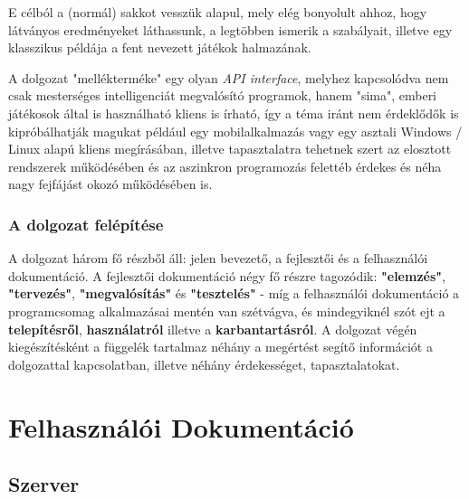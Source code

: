 \documentclass[twoside, a4paper, 12pt]{book}
\begin{document}
E célból a (normál) sakkot vesszük alapul, mely elég bonyolult ahhoz, hogy látványos eredményeket láthassunk, a legtöbben ismerik a szabályait, illetve egy klasszikus példája a fent nevezett játékok halmazának.

A dolgozat "mellékterméke" egy olyan \textit{API interface}, melyhez kapcsolódva nem csak mesterséges intelligenciát megvalósító programok, hanem "sima", emberi játékosok által is használható kliens is írható, így a téma iránt nem érdeklődők is kipróbálhatják magukat például egy mobilalkalmazás vagy egy asztali Windows / Linux alapú kliens megírásában, illetve tapasztalatra tehetnek szert az elosztott rendszerek működésében és az aszinkron programozás felettéb érdekes és néha nagy fejfájást okozó működésében is.

\section{A dolgozat felépítése}
A dolgozat három fő részből áll: jelen bevezető, a fejlesztői és a felhasználói dokumentáció.
A fejlesztői dokumentáció négy fő részre tagozódik: \textbf{"elemzés"}, \textbf{"tervezés"}, \textbf{"megvalósítás"} és \textbf{"tesztelés"} - míg a felhasználói dokumentáció a programcsomag alkalmazásai mentén van szétvágva, és mindegyiknél szót ejt a \textbf{telepítésről}, \textbf{használatról} illetve a \textbf{karbantartásról}.
A dolgozat végén kiegészítésként a függelék tartalmaz néhány a megértést segítő információt a dolgozattal kapcsolatban, illetve néhány érdekességet, tapasztalatokat.




\newpage
\part{Felhasználói Dokumentáció}

\chapter{Szerver}
\end{document}
